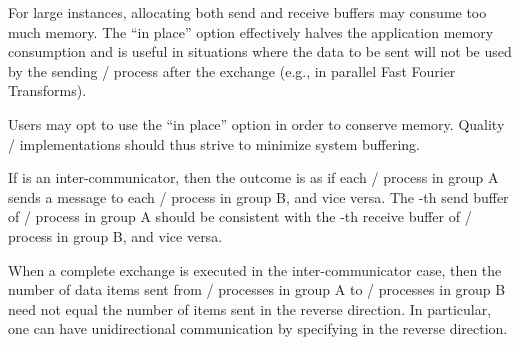 \begin{rationale}
For large  instances,
allocating both send and receive buffers may consume too much memory.
The ``in place'' option effectively halves the application memory consumption
and is useful in situations where the data to be sent will not be used by the
sending \MPI/ process after the  exchange (e.g., in parallel
Fast Fourier Transforms).
\end{rationale}

\begin{implementors}
Users may opt to use the ``in place'' option in order to conserve memory.
Quality \MPI/ implementations should thus strive to minimize system buffering.
\end{implementors}

If  is an inter-communicator, then the outcome is as if
each \MPI/ process in group A sends a message to each \MPI/ process in group B,
and vice versa.  The -th send buffer of \MPI/ process  in group A should
be consistent with the -th receive buffer of \MPI/ process  in group B,
and vice versa.

\begin{users}
When a complete exchange is executed in the inter-communicator case, then
the number of data items sent from \MPI/ processes in group A to \MPI/ processes
in group B need not equal the number of items sent in the reverse
direction.  In particular, one can have unidirectional communication
by specifying  in the reverse direction.
\end{users}


